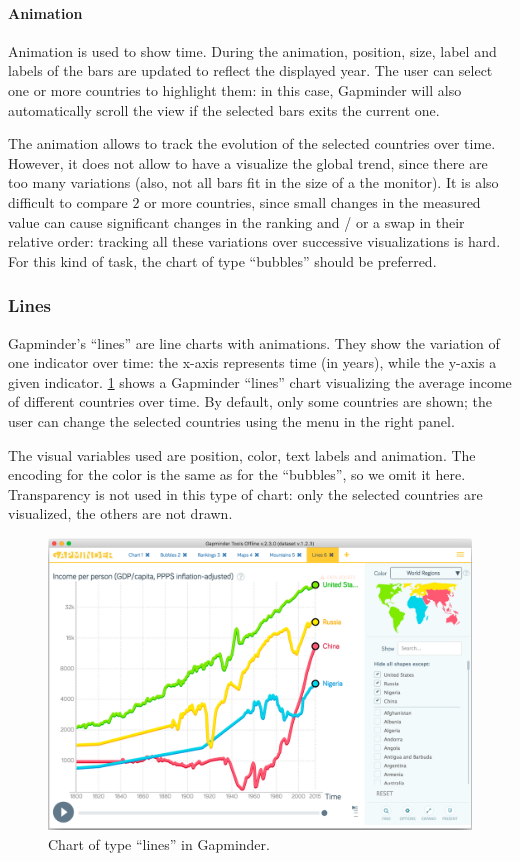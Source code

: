 \paragraph{Animation}
Animation is used to show time.
During the animation, position, size, label and labels of the bars are updated to reflect the displayed year.
The user can select one or more countries to highlight them:
in this case, Gapminder will also automatically scroll the view if the selected bars exits the current one.

The animation allows to track the evolution of the selected countries over time.
However, it does not allow to have a visualize the global trend, since there are too many variations (also, not all bars fit in the size of a the monitor).
It is also difficult to compare $2$ or more countries, since small changes in the measured value can cause significant changes in the ranking and / or a swap in their relative order: tracking all these variations over successive visualizations is hard.
For this kind of task, the chart of type ``bubbles'' should be preferred.


\subsubsection{Lines}
Gapminder's ``lines'' are line charts with animations.
They show the variation of one indicator over time:
the x-axis represents time (in years), while the y-axis a given indicator.
\cref{fig:lines} shows a Gapminder ``lines'' chart visualizing the average income of different countries over time.
By default, only some countries are shown;
the user can change the selected countries using the menu in the right panel.

The visual variables used are position, color, text labels and animation.
The encoding for the color is the same as for the ``bubbles'', so we omit it here.
Transparency is not used in this type of chart:
only the selected countries are visualized, the others are not drawn.

\begin{figure}[h]
	\centering
	\includegraphics[width=0.95\columnwidth]{figures/lines}
	\caption{Chart of type ``lines'' in Gapminder.}
	\label{fig:lines}
\end{figure}

